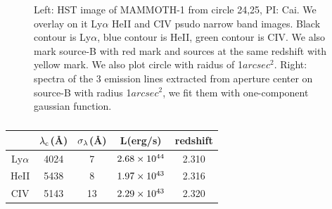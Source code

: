 \documentclass[../Results.tex]{subfiles}
\begin{document}
\begin{figure}
		\centering
		\label{overlayspec}
		\caption{Left: HST image of MAMMOTH-1 from circle 24,25, PI: Cai. We overlay on it Ly$\alpha$ HeII and CIV psudo narrow band images. Black contour is Ly$\alpha$, blue contour is HeII, green contour is CIV. We also mark source-B with red mark and sources at the same redshift with yellow mark. We also plot circle with raidus of 1$arcsec^{2}$. Right: spectra of the 3 emission lines extracted from aperture center on source-B with radius 1$arcsec^{2}$, we fit them with one-component gaussian function.}
\end{figure}
	\begin{table}[htp]
	\begin{center}
		\begin{tabular}{ccccc}
\hline
\hline
& $\rm \lambda_{c}$(\AA) & $\rm \sigma_{\lambda}$(\AA) & L(erg/s) & redshift \\ \hline
Ly$\alpha$ &   4024  &     7  &   $\rm 2.68 \times 10^{44}$ & 2.310        \\
HeII       &   5438  &     8  &   $\rm 1.97 \times 10^{43}$ & 2.316        \\
CIV        &   5143  &     13 &   $\rm 2.29 \times 10^{43}$ & 2.320        \\ \hline
\end{tabular}
\end{center}
	\caption{}
	\label{fit_L}
	\end{table}
\end{document}
